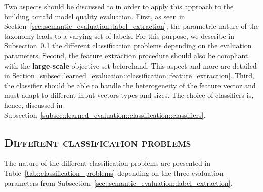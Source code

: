     Two aspects should be discussed to in order to apply this approach to the building \gls{acr::3d} model quality evaluation.
    First, as seen in Section~\ref{sec::semantic_evaluation::label_extraction}, the parametric nature of the taxonomy leads to a varying set of labels.
    For this purpose, we describe in Subsection~\ref{subsec::learned_evaluation::classification::different_porblems} the different classification problems depending on the evaluation parameters.
    Second, the feature extraction procedure should also be compliant with the \textbf{large-scale} objective set beforehand.
    This aspect and more are detailed in Section~\ref{subsec::learned_evaluation::classification::feature_extraction}.
    Third, the classifier should be able to handle the heterogeneity of the feature vector and must adapt to different input vectors types and sizes.
    The choice of classifiers is, hence, discussed in Subsection~\ref{subsec::learned_evaluation::classification::classifiers}.

    \subsection{\textsc{Different classification problems}}
        \label{subsec::learned_evaluation::classification::different_porblems}
        The nature of the different classification problems are presented in Table~\ref{tab::classification_problems} depending on the three evaluation parameters from Subsection~\ref{sec::semantic_evaluation::label_extraction}.

